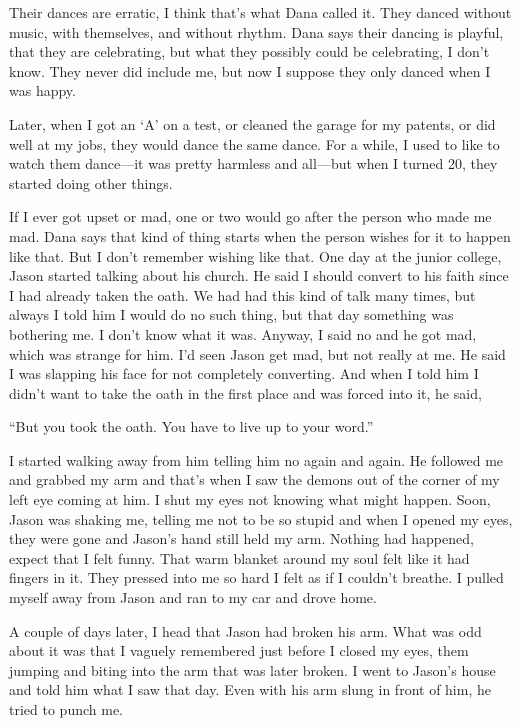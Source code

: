 Their dances are erratic, I think that's what Dana called it. They
danced without music, with themselves, and without rhythm. Dana says
their dancing is playful, that they are celebrating, but what they
possibly could be celebrating, I don't know. They never did include me,
but now I suppose they only danced when I was happy.

Later, when I got an `A' on a test, or cleaned the garage for my
patents, or did well at my jobs, they would dance the same dance. For a
while, I used to like to watch them dance---it was pretty harmless and
all---but when I turned 20, they started doing other things.

If I ever got upset or mad, one or two would go after the person who
made me mad. Dana says that kind of thing starts when the person wishes
for it to happen like that. But I don't remember wishing like that. One
day at the junior college, Jason started talking about his church. He
said I should convert to his faith since I had already taken the oath.
We had had this kind of talk many times, but always I told him I would
do no such thing, but that day something was bothering me. I don't know
what it was. Anyway, I said no and he got mad, which was strange for
him. I'd seen Jason get mad, but not really at me. He said I was
slapping his face for not completely converting. And when I told him I
didn't want to take the oath in the first place and was forced into it,
he said,

``But you took the oath. You have to live up to your word.''

I started walking away from him telling him no again and again. He
followed me and grabbed my arm and that's when I saw the demons out of
the corner of my left eye coming at him. I shut my eyes not knowing what
might happen. Soon, Jason was shaking me, telling me not to be so stupid
and when I opened my eyes, they were gone and Jason's hand still held my
arm. Nothing had happened, expect that I felt funny. That warm blanket
around my soul felt like it had fingers in it. They pressed into me so
hard I felt as if I couldn't breathe. I pulled myself away from Jason
and ran to my car and drove home.

A couple of days later, I head that Jason had broken his arm. What was
odd about it was that I vaguely remembered just before I closed my eyes,
them jumping and biting into the arm that was later broken. I went to
Jason's house and told him what I saw that day. Even with his arm slung
in front of him, he tried to punch me.

